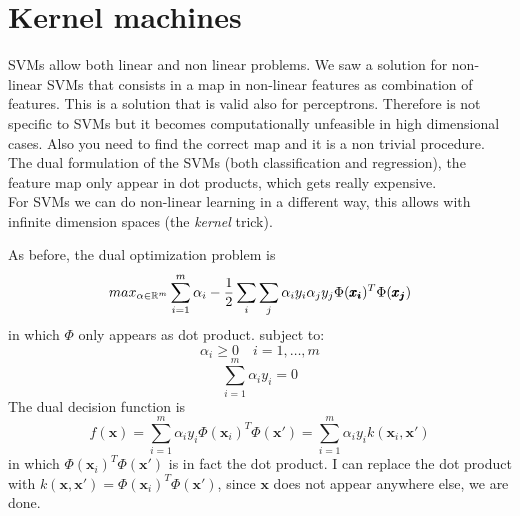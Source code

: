 \chapter{Kernel machines}
\label{cha:kernel_machines}

SVMs allow both linear and non linear problems. We saw a solution for non-linear SVMs that consists in a map in non-linear features as combination of features. This is a solution that is valid also for perceptrons. 
Therefore is not specific to SVMs but it becomes computationally unfeasible in high dimensional cases.
Also you need to find the correct map and it is a non trivial procedure.
The dual formulation of the SVMs (both classification and regression), the feature map only appear in dot products, which gets really expensive.\\

For SVMs we can do non-linear learning in a different way, this allows with infinite dimension spaces (the \textit{kernel} trick).\\


As before, the dual optimization problem is 
$$max_{\alpha \in \mathbb{R}^m}\sum_{i=1}^m \alpha_i - 
    \frac{1}{2} \sum_{i} \sum_{j} \alpha_i y_i \alpha_j y_j \Phi(\pmb{x_i}) ^T \Phi(\pmb{x_j}) $$
in which $\Phi$ only appears as dot product.
subject to:
$$\alpha_i \geq 0 \quad i = 1, \dots, m$$
$$\sum_{i=1}^m \alpha_i y_i = 0$$
The dual decision function is
$$f(\pmb{x}) = \sum _{i=1} ^m \alpha_i y_i \Phi(\pmb{x}_i)^T \Phi(\pmb{x'}) = \sum _{i=1} ^m \alpha_i y_i k(\pmb{x}_i , \pmb{x'})$$
in which $\Phi(\pmb{x}_i)^T \Phi(\pmb{x'})$ is in fact the dot product. I can replace the dot product with $k(\pmb{x}, \pmb{x'}) = \Phi(\pmb{x}_i)^T \Phi(\pmb{x'})$, since $\pmb{x}$ does not appear anywhere else, we are done.\\

